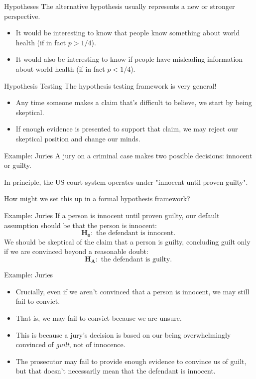 \begin{frame}{Hypotheses}
    The alternative hypothesis usually represents a new or stronger perspective.
    \begin{itemize}
        \item It would be interesting to know that people know something about world health (if in fact $p>1/4$).
        \item It would also be interesting to know if people have misleading information about world health (if in fact $p<1/4$).
    \end{itemize}
\end{frame}

\begin{frame}{Hypothesis Testing}
    The hypothesis testing framework is very general!
    \begin{itemize}
        \item Any time someone makes a claim that's difficult to believe, we start by being skeptical.
        \item If enough evidence is presented to support that claim, we may reject our skeptical position and change our minds.
    \end{itemize}
\end{frame}

\begin{frame}{Example: Juries}
    A jury on a criminal case makes two possible decisions: innocent or guilty.
    
   \vspace{12pt}In principle, the US court system operates under "innocent until proven guilty".  
    
    \vspace{12pt}How might we set this up in a formal hypothesis framework?
\end{frame}

\begin{frame}{Example: Juries}
    If a person is innocent until proven guilty, our default assumption should be that the person is innocent:
    \[
        \boldsymbol{H_0}: \text{ the defendant is innocent. }
    \]
    We should be skeptical of the claim that a person is guilty, concluding guilt only if we are convinced beyond a reasonable doubt:
    \[
        \boldsymbol{H_A}: \text{ the defendant is guilty. }
    \]
\end{frame}

\begin{frame}{Example: Juries}
    \begin{itemize}
        \item Crucially, even if we aren't convinced that a person is innocent, we may still fail to convict.
        \item That is, we may fail to convict because we are unsure.
        \item This is because a jury's decision is based on our being overwhelmingly convinced of \textit{guilt}, not of innocence.
        \item The prosecutor may fail to provide enough evidence to convince us of guilt, but that doesn't necessarily mean that the defendant is innocent. 
    \end{itemize}
\end{frame}

